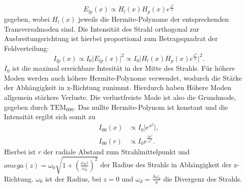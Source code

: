 \begin{equation}
    E_{lp}(x) \propto H_l(x) H_p(x) e^{\frac{x^2}{2}}
\end{equation}
gegeben, wobei $H_i(x)$ jeweils die Hermite-Polynome der entsprechenden Transversalmoden sind. Die Intensität des Strahl orthogonal zur Ausbreitungsrichtung ist hierbei
proportional zum Betragsquadrat der Feldverteilung:
\begin{equation}
    I_{lp}(x) \propto I_0 \lvert E_{lp}(x) \rvert ^2 \propto I_0 \lvert H_l(x) H_p(x) e^{\frac{x^2}{2}} \rvert ^2.
\end{equation}
$I_0$ ist die maximal erreichbare Intesität in der Mitte des Strahls. Für höhere Moden werden auch höhere Hermite-Polynome verwendet, wodurch die Stärke der
Abhängigkeit in x-Richtung zunimmt. Hierdurch haben Höhere Moden allgemein stärkere Verluste. Die verlustfreiste Mode ist also die Grundmode, gegeben durch $\mathrm{TEM}_{000}$.
Das nullte Hermite-Polynom ist konstant und die Intensität ergibt sich somit zu
\begin{align}
    I_{00}(x) &\propto I_0 \lvert e^{x^2} \rvert ,\\
    I_{00}(r) &\propto I_0 e^{\frac{2r^2}{\omega^2}}.
\end{align}
Hierbei ist $r$ der radiale Abstand zum Strahlmittelpunkt und $omega(z) = \omega_0\sqrt{1+(\frac{\omega_d z}{\omega_0})^2}$ der Radius des Strahls in Abhängigkeit der z-Richtung.
$\omega_0$ ist der Radius, bei $z=0$ und $\omega_d = \frac{\lambda\omega_0}{\pi}$ die Divergenz des Strahls.